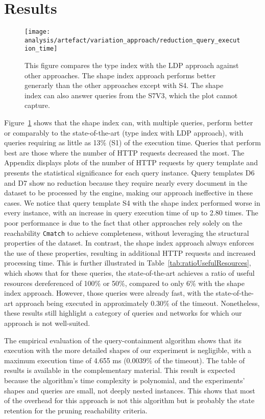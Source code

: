 \section{Results}

\begin{figure}[h]
    \centering
    \texttt{[image: analysis/artefact/variation\_approach/reduction\_query\_execution\_time]}
    \caption{
        This figure compares the type index with the LDP approach against other approaches.
        The shape index approach performs better generarly than the other approaches except with S4.
        The shape index can also answer queries from the S7V3, which the plot cannot capture.
    }
    \label{fig:compApproach}
\end{figure}


Figure~\ref{fig:compApproach} shows that the shape index can, with multiple queries, perform better or comparably to the state-of-the-art (type index with LDP approach), with queries requiring as little as 13\% (S1) of the execution time.
Queries that perform best are those where the number of HTTP requests decreased the most.
The Appendix displays plots of the number of HTTP requests by query template and presents the statistical significance for each query instance.
Query templates D6 and D7 show no reduction because they require nearly every document in the dataset to be processed by the engine, making our approach ineffective in these cases.
We notice that query template S4 with the shape index performed worse in every instance, with an increase in query execution time of up to 2.80 times.
The poor performance is due to the fact that other approaches rely solely on the reachability \texttt{Cmatch} to achieve completeness, without leveraging the structural properties of the dataset. 
In contrast, the shape index approach always enforces the use of these properties, resulting in additional HTTP requests and increased processing time.
This is further illustrated in Table~\ref{tab:ratioUsefulResources}, which shows that for these queries, the state-of-the-art achieves a ratio of useful resources dereferenced of 100\% or 50\%, compared to only 6\% with the shape index approach.
However, those queries were already fast, with the state-of-the-art approach being executed in approximately 0.30\% of the timeout.
Nonetheless, these results still highlight a category of queries and networks for which our approach is not well-suited.

The empirical evaluation of the query-containment algorithm shows that its execution with the more detailed shapes of our experiment is negligible, with a maximum execution time of 4.655 ms (0.0039\% of the timeout).
The table of results is available in the complementary material.
This result is expected because the algorithm's time complexity is polynomial, and the experiments' shapes and queries are small, not deeply nested instances.
This shows that most of the overhead for this approach is not this algorithm but is probably the state retention for the pruning reachability criteria.

